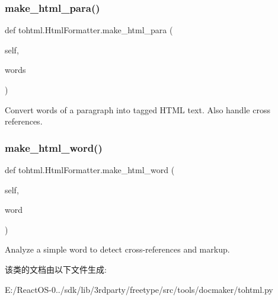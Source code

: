 \subsubsection{\texorpdfstring{make\+\_\+html\+\_\+para()}{make\_html\_para()}}
{\footnotesize\ttfamily def tohtml.\+Html\+Formatter.\+make\+\_\+html\+\_\+para (\begin{DoxyParamCaption}\item[{}]{self,  }\item[{}]{words }\end{DoxyParamCaption})}

\begin{DoxyVerb}Convert words of a paragraph into tagged HTML text.  Also handle
   cross references.\end{DoxyVerb}
 \mbox{\label{classtohtml_1_1_html_formatter_a7eeb95b937b988a88537e32ace23a65f}} 
\subsubsection{\texorpdfstring{make\+\_\+html\+\_\+word()}{make\_html\_word()}}
{\footnotesize\ttfamily def tohtml.\+Html\+Formatter.\+make\+\_\+html\+\_\+word (\begin{DoxyParamCaption}\item[{}]{self,  }\item[{}]{word }\end{DoxyParamCaption})}

\begin{DoxyVerb}Analyze a simple word to detect cross-references and markup.\end{DoxyVerb}
 

该类的文档由以下文件生成\+:\begin{DoxyCompactItemize}
\item 
E\+:/\+React\+O\+S-\/0../sdk/lib/3rdparty/freetype/src/tools/docmaker/tohtml.\+py\end{DoxyCompactItemize}
